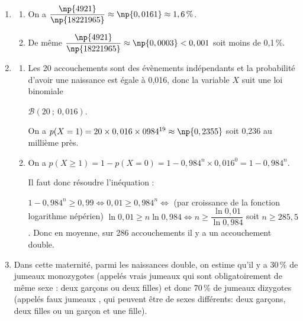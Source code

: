 \medskip

\begin{enumerate}
\item 

	\begin{enumerate}
		\item 
		On a $\dfrac{\np{4921}}{\np{18221965}} \approx \np{0,0161} \approx 1,6\,\%$.
		\item 
De même $\dfrac{\np{4921}}{\np{18221965}} \approx \np{0,0003}< 0,001$ soit moins de 0,1\,\%.













	\end{enumerate}
\item 




	\begin{enumerate}
		\item 
Les 20 accouchements sont des évènements indépendants et la probabilité d'avoir une naissance est égale à 0,016, donc la variable $X$ suit une loi binomiale 

$\mathcal{B}(20~;~0,016)$.

On a $p(X = 1) = 20 \times 0,016 \times 0984^{19} \approx \np{0,2355}$ soit 0,236 au millième près.
		\item 
		
On a $p(X \geqslant 1) = 1 - p(X = 0) = 1 - 0,984^n \times 0,016^0  = 1 - 0,984^n$.

Il faut donc résoudre l'inéquation :

$1 - 0,984^n \geqslant 0,99 \iff 0,01 \geqslant 0,984^n \iff$ (par croissance de la fonction logarithme népérien) $\ln 0,01 \geqslant n \ln 0,984 \iff n \geqslant \dfrac{\ln 0,01}{ \ln 0,984}$ soit $n \geqslant 285,5$. Donc en moyenne, sur 286 accouchements il y a un accouchement double.


	\end{enumerate}
\item Dans cette maternité, parmi les naissances double, on estime qu'il y a 30\,\% de jumeaux
monozygotes (appelés \og  vrais jumeaux \fg{} qui sont obligatoirement de même sexe : deux garçons ou deux filles) et donc 70\,\% de jumeaux dizygotes (appelés \og  faux jumeaux \fg, qui
peuvent être de sexes différents: deux garçons, deux filles ou un garçon et une fille).


\end{enumerate}
